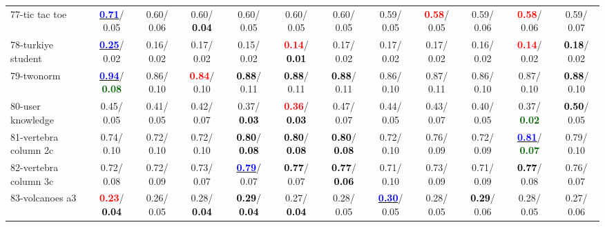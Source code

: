 \begin{table}[h]
\begin{center}
{\begin{tabular}{lc|c|c|c|c|c|c|c|c|c|c}
77-tic tac toe & \underline{\textcolor{blue}{\textbf{  0.71}}}/  0.05 &   0.60/  0.06 &   0.60/\textcolor{black}{\textbf{  0.04}} &   0.60/  0.05 &   0.60/  0.05 &   0.60/  0.05 &   0.59/  0.05 & \textcolor{red}{\textbf{  0.58}}/  0.05 &   0.59/  0.06 & \textcolor{red}{\textbf{  0.58}}/  0.06 &   0.59/  0.07 \\
78-turkiye student & \underline{\textcolor{blue}{\textbf{  0.25}}}/  0.02 &   0.16/  0.02 &   0.17/  0.02 &   0.15/  0.02 & \textcolor{red}{\textbf{  0.14}}/\textcolor{black}{\textbf{  0.01}} &   0.17/  0.02 &   0.17/  0.02 &   0.17/  0.02 &   0.16/  0.02 & \textcolor{red}{\textbf{  0.14}}/  0.02 & \textcolor{black}{\textbf{  0.18}}/  0.02 \\ \hline
79-twonorm & \underline{\textcolor{blue}{\textbf{  0.94}}}/\textcolor{darkgreen}{\textbf{  0.08}} &   0.86/  0.10 & \textcolor{red}{\textbf{  0.84}}/  0.10 & \textcolor{black}{\textbf{  0.88}}/  0.11 & \textcolor{black}{\textbf{  0.88}}/  0.11 & \textcolor{black}{\textbf{  0.88}}/  0.11 &   0.86/  0.10 &   0.87/  0.11 &   0.86/  0.10 &   0.87/  0.10 & \textcolor{black}{\textbf{  0.88}}/  0.10 \\
80-user knowledge &   0.45/  0.05 &   0.41/  0.05 &   0.42/  0.07 &   0.37/\textcolor{black}{\textbf{  0.03}} & \textcolor{red}{\textbf{  0.36}}/\textcolor{black}{\textbf{  0.03}} &   0.47/  0.07 &   0.44/  0.05 &   0.43/  0.07 &   0.40/  0.05 &   0.37/\textcolor{darkgreen}{\textbf{  0.02}} & \textcolor{black}{\textbf{  0.50}}/  0.05 \\
81-vertebra column 2c &   0.74/  0.10 &   0.72/  0.10 &   0.72/  0.10 & \textcolor{black}{\textbf{  0.80}}/\textcolor{black}{\textbf{  0.08}} & \textcolor{black}{\textbf{  0.80}}/\textcolor{black}{\textbf{  0.08}} & \textcolor{black}{\textbf{  0.80}}/\textcolor{black}{\textbf{  0.08}} &   0.72/  0.10 &   0.76/  0.09 &   0.72/  0.09 & \underline{\textcolor{blue}{\textbf{  0.81}}}/\textcolor{darkgreen}{\textbf{  0.07}} &   0.79/  0.10 \\
82-vertebra column 3c &   0.72/  0.08 &   0.72/  0.09 &   0.73/  0.07 & \underline{\textcolor{blue}{\textbf{  0.79}}}/  0.07 & \textcolor{black}{\textbf{  0.77}}/  0.07 & \textcolor{black}{\textbf{  0.77}}/\textcolor{black}{\textbf{  0.06}} &   0.71/  0.10 &   0.73/  0.09 &   0.71/  0.09 & \textcolor{black}{\textbf{  0.77}}/  0.08 &   0.76/  0.07 \\
83-volcanoes a3 & \textcolor{red}{\textbf{  0.23}}/\textcolor{black}{\textbf{  0.04}} &   0.26/  0.05 &   0.28/\textcolor{black}{\textbf{  0.04}} & \textcolor{black}{\textbf{  0.29}}/\textcolor{black}{\textbf{  0.04}} &   0.27/\textcolor{black}{\textbf{  0.04}} &   0.28/  0.05 & \underline{\textcolor{blue}{\textbf{  0.30}}}/  0.05 &   0.28/  0.05 & \textcolor{black}{\textbf{  0.29}}/  0.06 &   0.28/  0.05 &   0.27/  0.06 \\

\end{tabular}}
\end{center}
\end{table}
